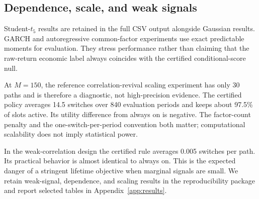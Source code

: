 \subsection{Dependence, scale, and weak signals}
Student-$t_5$ results are retained in the full CSV output alongside Gaussian results. GARCH and autoregressive common-factor experiments use exact predictable moments for evaluation. They stress performance rather than claiming that the raw-return economic label always coincides with the certified conditional-score null.

At $M=150$, the reference correlation-revival scaling experiment has only 30 paths and is therefore a diagnostic, not high-precision evidence. The certified policy averages 14.5 switches over 840 evaluation periods and keeps about 97.5\% of slots active. Its utility difference from always on is negative. The factor-count penalty and the one-switch-per-period convention both matter; computational scalability does not imply statistical power.

In the weak-correlation design the certified rule averages 0.005 switches per path. Its practical behavior is almost identical to always on. This is the expected danger of a stringent lifetime objective when marginal signals are small. We retain weak-signal, dependence, and scaling results in the reproducibility package and report selected tables in Appendix~\ref{app:results}.


